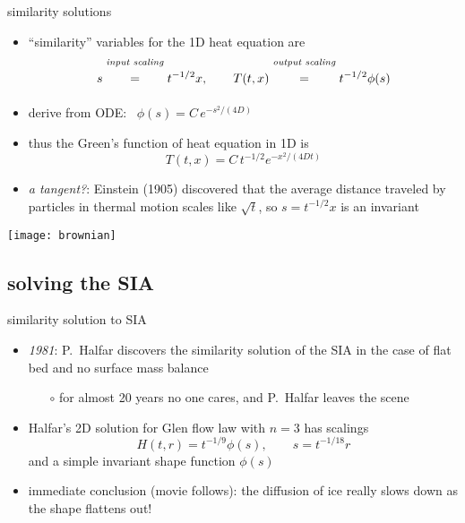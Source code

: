 \begin{frame}{similarity solutions}

\begin{itemize}
\item ``similarity'' variables for the 1D heat equation are
	$$s \stackrel{\text{\emph{input scaling}}}{\phantom{\Big|}=\phantom{\Big|}} t^{-1/2} x, \qquad T(t,x) \stackrel{\text{\emph{output scaling}}}{\phantom{\Big|}=\phantom{\Big|}} t^{-1/2} \phi(s)$$
\item derive from ODE: \, $\phi(s) = C\, e^{-s^2/(4D)}$
\item thus the Green's function of heat equation in 1D is
	$$T(t,x) = C\, t^{-1/2} e^{-x^2/(4Dt)}$$

\bigskip
\item \begin{minipage}[t]{0.55\textwidth}
\noindent \emph{a tangent?}: Einstein (1905) discovered that the average distance traveled by particles in thermal motion scales like $\sqrt{t}$, so $s = t^{-1/2}x$ is an invariant
\end{minipage}
\end{itemize}

\vspace{-20mm}
\hfill \texttt{[image: brownian]}
\end{frame}


\subsection{solving the SIA}

\begin{frame}{similarity solution to SIA}

\begin{itemize}
\item \emph{1981}:  P.~Halfar discovers the similarity solution of the SIA in the case of flat bed and no surface mass balance
  \begin{itemize}
  \item[$\circ$] for almost 20 years no one cares, and P.~Halfar leaves the scene
  \end{itemize}
\item Halfar's 2D solution for Glen flow law with $n=3$ has scalings
   $$H(t,r)=t^{-1/9} \phi(s), \qquad s = t^{-1/18} r$$
and a simple invariant shape function $\phi(s)$

\medskip
\item immediate conclusion (\alert{movie follows}): the diffusion of ice really slows down as the shape flattens out!
\end{itemize}
\end{frame}



